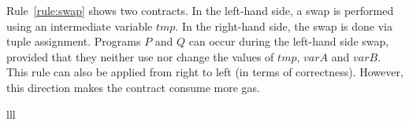 \documentclass[manuscript,screen,review]{acmart}
\begin{document}
Rule~\ref{rule:swap} shows two contracts. In the left-hand side, a swap is performed using an intermediate variable $\mathit{tmp}$. In the right-hand side, the swap is done via tuple assignment. Programs $P$ and $Q$ can occur during the left-hand side swap, provided that they neither use nor change the values of $\mathit{tmp}$, $\mathit{varA}$ and $\mathit{varB}$. This rule can also be applied from right to left (in terms of correctness). However, this direction makes the contract consume more gas.

\begin{refactoring}[htb]
\begin{footnotesize}
\begin{tabular}{lll}


\end{tabular}
\end{footnotesize}
\end{refactoring}
\end{document}

